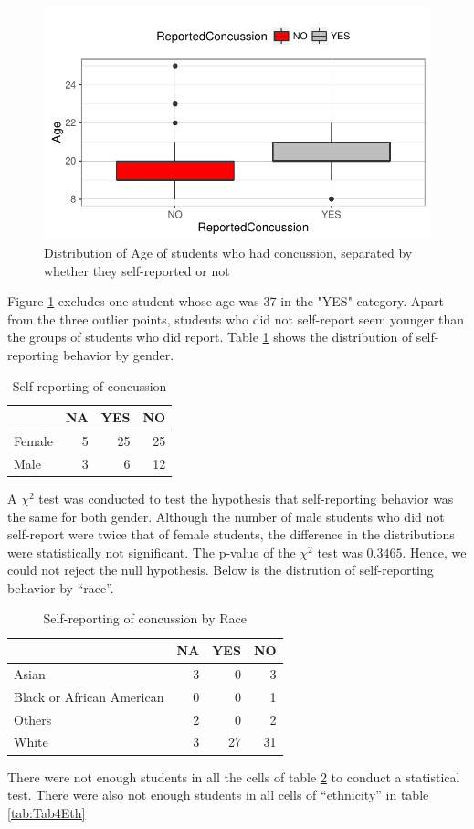 \documentclass[11]{article}
\begin{document}
\begin{figure}[H]
\centering
\includegraphics[width=0.5\linewidth]{Plot1Age.pdf}
\caption{Distribution of Age of students who had concussion, separated by whether they self-reported or not}
\label{fig:Fig1Age}
\end{figure}
Figure \ref{fig:Fig1Age} excludes one student whose age was 37 in the "YES" category. Apart from the three outlier points, students who did not self-report seem younger than the groups of students who did report. Table \ref{tab:Tab2Gender} shows the distribution of self-reporting behavior by gender. 
\begin{table}[H]
\centering
\begin{tabular}{lrrr}
  \hline
 & NA & YES & NO \\ 
  \hline
Female &   5 &  25 &  25 \\ 
  Male &   3 &   6 &  12 \\ 
   \hline
\end{tabular}
\caption{Self-reporting of concussion} 
\label{tab:Tab2Gender}
\end{table}A $\chi^2$ test was conducted to test the hypothesis that self-reporting behavior was the same for both gender. Although the number of male students who did not self-report were twice that of female students, the difference in the distributions were statistically not significant. The p-value of the $\chi^2$ test was $0.3465$. Hence, we could not reject the null hypothesis. Below is the distrution of self-reporting behavior by ``race''.
\begin{table}[H]
\centering
\begin{tabular}{lrrr}
  \hline
 & NA & YES & NO \\ 
  \hline
Asian &   3 &   0 &   3 \\ 
  Black or African American &   0 &   0 &   1 \\ 
  Others &   2 &   0 &   2 \\ 
  White &   3 &  27 &  31 \\ 
   \hline
\end{tabular}
\caption{Self-reporting of concussion by Race} 
\label{tab:Tab3Race}
\end{table}There were not enough students in all the cells of table \ref{tab:Tab3Race} to conduct a statistical test. There were also not enough students in all cells of ``ethnicity'' in table \ref{tab:Tab4Eth}
\end{document}
